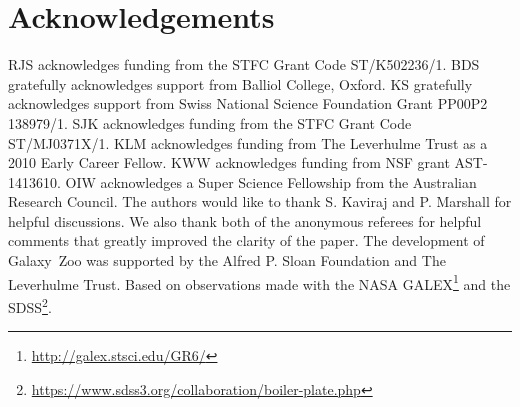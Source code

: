 \documentclass[useAMS,usenatbib]{mn2e}
\def\newref    {\color{new} }
\begin{document}
\section*{Acknowledgements}

RJS acknowledges funding from the STFC Grant Code ST/K502236/1. BDS gratefully acknowledges support from Balliol College, Oxford. KS gratefully acknowledges support from Swiss National Science Foundation Grant PP00P2 138979/1. SJK acknowledges funding from the STFC Grant Code ST/MJ0371X/1. KLM acknowledges funding from The Leverhulme Trust as a 2010 Early Career Fellow. KWW acknowledges funding from NSF grant AST-1413610. OIW acknowledges a Super Science Fellowship from the Australian Research Council. The authors would like to thank S. Kaviraj and P. Marshall for helpful discussions. We also thank {\newref both of the} anonymous referees for helpful comments that greatly improved the clarity of the paper. The development of Galaxy~Zoo was supported by the Alfred P. Sloan Foundation and The Leverhulme Trust. Based on observations made with the NASA GALEX\footnote{\url{http://galex.stsci.edu/GR6/}} and the SDSS\footnote{\url{https://www.sdss3.org/collaboration/boiler-plate.php}}.

\end{document}
